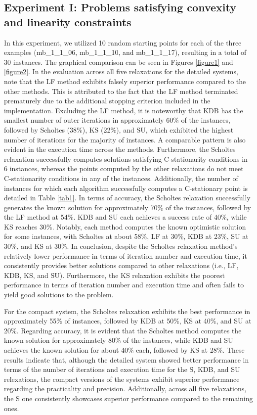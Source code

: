 \subsection{Experiment I: Problems  satisfying convexity and linearity constraints }
In this experiment, we utilized 10 random starting points for each of the three examples ({mb\_1\_1\_06}, {mb\_1\_1\_10}, and {mb\_1\_1\_17}), resulting in a total of 30 instances. The graphical comparison can be seen in Figures \ref{figure1} and \ref{figure2}. 
In the evaluation across all five relaxations for the detailed systems, note that the LF method exhibits falsely superior performance compared to the other methods. This is attributed to the fact that the LF method terminated prematurely due to the additional stopping criterion included in the implementation. Excluding the LF method, it is noteworthy that KDB has the smallest number of outer iterations in approximately 60\% of the instances, followed by Scholtes (38\%), KS (22\%), and SU, which exhibited the highest number of iterations for the majority of instances. A comparable pattern is also evident in the execution time across the methods.  Furthermore, the Scholtes relaxation successfully computes solutions satisfying C-stationarity conditions in 6 instances, whereas the points computed by the other relaxations do not meet C-stationarity conditions in any of the instances. Additionally, the number of instances for which each algorithm successfully computes a C-stationary point is detailed in Table \ref{tab1}. In terms of accuracy, the Scholtes relaxation  successfully generates the known solution for approximately 70\% of the instances, followed by the LF method at 54\%. KDB and SU each achieves a success rate of 40\%, while KS reaches 30\%. Notably, each method computes the known optimistic solution for some instances, with Scholtes at about 58\%, LF at 30\%, KDB at 23\%, SU at 30\%, and KS at 30\%. In conclusion, despite the Scholtes relaxation method's relatively lower performance in terms of iteration number and execution time, it consistently provides better solutions compared to other relaxations (i.e., LF, KDB, KS, and SU). Furthermore, the KS relaxation exhibits the poorest performance in terms of iteration number and execution time and often fails to yield good solutions to the problem.

For the compact system, the Scholtes relaxation exhibits the best performance in approximately 55\% of instances, followed by KDB at 50\%, KS at 40\%, and SU at 20\%. Regarding accuracy, it is evident that the Scholtes method computes the known solution for approximately 80\% of the instances, while KDB and SU achieves the known solution for about 40\% each, followed by KS at 28\%. These results indicate that, although the detailed system showed better performance in terms of the number of iterations and execution time for the S, KDB, and SU relexations, the compact versions of the systems exhibit superior performance regarding the practicality and precision. Additionally, across all five relaxations, the S one consistently showcases superior performance compared to the remaining ones. 

